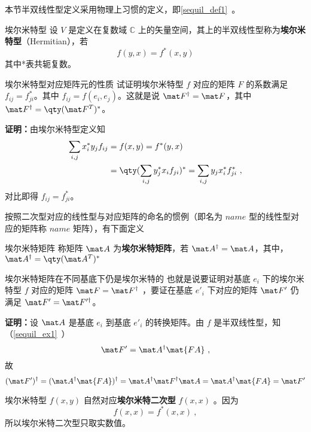 本节半双线性型定义采用物理上习惯的定义，即\autoref{sequil_def1}~。
\begin{definition}{埃尔米特型}
设 $V$ 是定义在复数域 $\mathbb{C}$ 上的矢量空间，其上的半双线性型称为\textbf{埃尔米特型}（Hermitian），若
\begin{equation}\label{HeFor_eq2}
f(   y,   x)=f^*(   x,   y)
\end{equation}
其中*表共轭复数。
\end{definition}
\begin{example}{埃尔米特型对应矩阵元的性质}
试证明埃尔米特型 $f$ 对应的矩阵 $F$ 的系数满足 $f_{ij}=f_{ji}^*$。其中 $f_{ij}=f(   e_i,   e_j)$。这就是说 $\mat F^\dagger=\mat F$，其中 $\mat F^\dagger=\qty(\mat F^T)^*$。

\textbf{证明：}由埃尔米特型定义知
\begin{equation}
\begin{aligned}
\sum_{i,j}x_i^*y_j f_{ij}&=f(   x,   y)=f^*(   y,   x)\\
&=\qty(\sum_{i,j}y_j^* x_i f_{ji})^*=\sum_{i,j}y_j x_i^*f_{ji}^*~,
\end{aligned}
\end{equation}
对比即得 $f_{ij}=f_{ji}^*$。
\end{example}
按照二次型对应的线性型与对应矩阵的命名的惯例（即名为 $name$ 型的线性型对应的矩阵称 $name$ 矩阵），有下面定义
\begin{definition}{埃尔米特矩阵}
称矩阵 $\mat A$ 为\textbf{埃尔米特矩阵}，若 $\mat A^\dagger=\mat A$，其中，$\mat A^\dagger=\qty(\mat A^T)^*$
\end{definition}
\begin{example}{埃尔米特矩阵在不同基底下仍是埃尔米特的}
也就是说要证明对基底 $   e_i$ 下的埃尔米特型 $f$ 对应的矩阵 $\mat F=\mat F^\dagger$ ，要证在基底 $   e'_i$ 下对应的矩阵 $\mat F'$ 仍满足 $\mat F'=\mat F'^\dagger$。

\textbf{证明：}设 $\mat A$ 是基底 $  e_i$ 到基底 $   e'_i$ 的转换矩阵。由 $f$ 是半双线性型，知（\autoref{sequil_ex1}~）
\begin{equation}
\mat F'=\mat A^\dagger \mat{FA}~,
\end{equation}
 故
\begin{equation}
(\mat F')^\dagger=(\mat A^\dagger \mat{FA})^\dagger=\mat A^\dagger \mat F^\dagger \mat A=\mat A^\dagger \mat{FA}=\mat F'
\end{equation}
\end{example}
埃尔米特型 $f(   x,   y)$ 自然对应\textbf{埃尔米特二次型} $f(   x,   x)$ 。因为
\begin{equation}
 f(   x,   x)= f^*(   x,   x) ~,
\end{equation}
所以埃尔米特二次型只取实数值。

